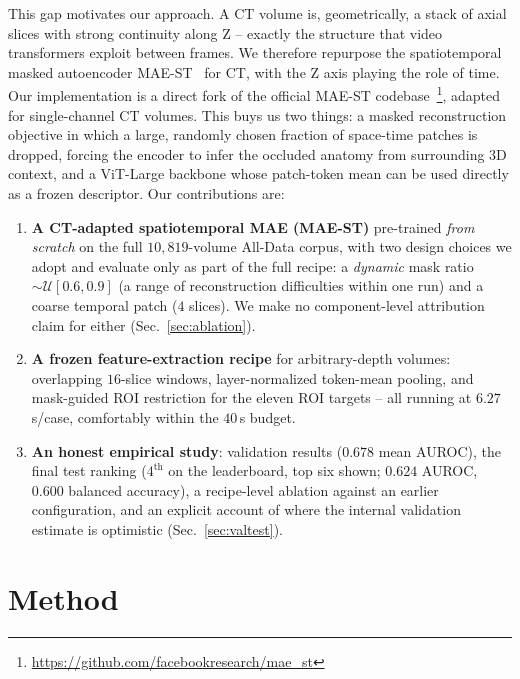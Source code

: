 \documentclass[runningheads]{llncs}
\begin{document}
This gap motivates our approach. A CT volume is, geometrically, a stack of axial
slices with strong continuity along Z -- exactly the structure that video
transformers exploit between frames. We therefore repurpose the spatiotemporal
masked autoencoder MAE-ST~\cite{maest} for CT, with the Z axis playing the role
of time. Our implementation is a direct fork of the official MAE-ST
codebase~\cite{maest}\footnote{\url{https://github.com/facebookresearch/mae_st}},
adapted for single-channel CT volumes. This buys us two things: a masked
reconstruction objective in which a large, randomly chosen fraction of
space-time patches is dropped, forcing the encoder to infer the occluded anatomy
from surrounding 3D context, and a ViT-Large backbone whose patch-token mean can be used
directly as a frozen descriptor. Our contributions are:
\label{sec:intro-contrib}
\begin{enumerate}
  \item \textbf{A CT-adapted spatiotemporal MAE (MAE-ST)} pre-trained
        \emph{from scratch} on the full $10{,}819$-volume All-Data corpus, with
        two design choices we adopt and evaluate only as part of the full
        recipe: a \emph{dynamic} mask ratio $\sim\mathcal{U}[0.6,0.9]$ (a range
        of reconstruction difficulties within one run) and a coarse temporal
        patch ($4$ slices). We make no component-level attribution claim for
        either (Sec.~\ref{sec:ablation}).
  \item \textbf{A frozen feature-extraction recipe} for arbitrary-depth volumes:
        overlapping $16$-slice windows, layer-normalized token-mean pooling, and
        mask-guided ROI restriction for the eleven ROI targets -- all running at
        $6.27$\,s/case, comfortably within the $40$\,s budget.
  \item \textbf{An honest empirical study}: validation results ($0.678$ mean
        AUROC), the final test ranking ($4^{\text{th}}$ on the leaderboard,
        top six shown; $0.624$ AUROC,
        $0.600$ balanced accuracy), a recipe-level ablation against an earlier
        configuration, and an explicit account of where the internal validation
        estimate is optimistic (Sec.~\ref{sec:valtest}).
\end{enumerate}

\section{Method}
\end{document}
